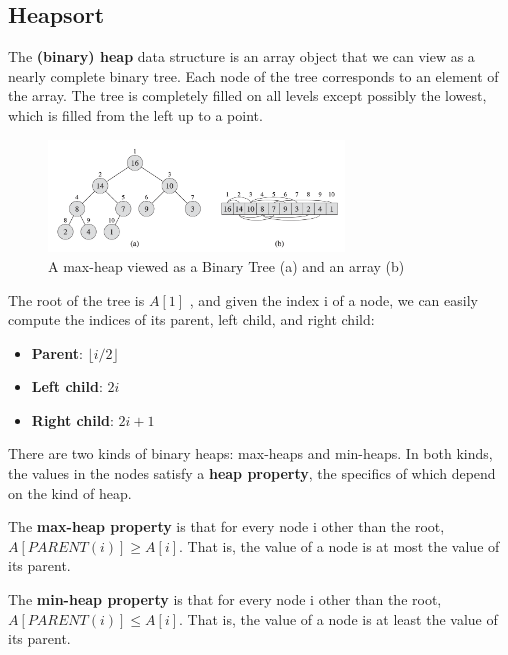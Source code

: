 \subsection{Heapsort}

The \textbf{(binary) heap} data structure is an array object that we can view as a nearly complete binary tree. Each node of the tree corresponds to an element of the array. The tree is completely filled on all levels except possibly the lowest, which is filled from the left up to a point.

\begin{figure}[H]
    \centering
    \includegraphics[width=0.7\textwidth]{assets/heap.png}
    \caption{A max-heap viewed as a Binary Tree (a) and an array (b) \cite{cormen2022introduction}}
\end{figure}

The root of the tree is $A[1]$ , and given the index i of a node, we
can easily compute the indices of its parent, left child, and right child:

\begin{itemize}
    \item \textbf{Parent}: $\lfloor i/2 \rfloor$
    \item \textbf{Left child}: $2i$
    \item \textbf{Right child}: $2i + 1$
\end{itemize}

There are two kinds of binary heaps: max-heaps and min-heaps. In both kinds,
the values in the nodes satisfy a \textbf{heap property}, the specifics of which depend on
the kind of heap.

\begin{definitionblock}
The \textbf{max-heap property} is that for every node i other than the root, $A[PARENT(i)] \geq A[i]$. That is, the value of a node is at most the value of its parent.
\end{definitionblock}

\begin{definitionblock}
The \textbf{min-heap property} is that for every node i other than the root, $A[PARENT(i)] \leq A[i]$. That is, the value of a node is at least the value of its parent.
\end{definitionblock}

